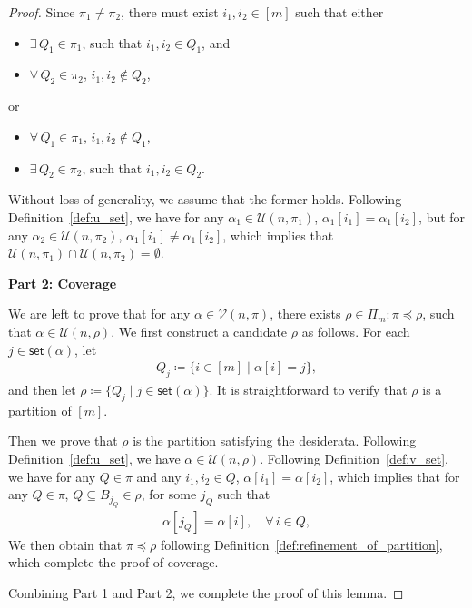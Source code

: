 \documentclass[sn-mathphys, natbib=false]{sn-jnl}
\theoremstyle{plain}
\theoremstyle{definition}
\newcommand{\sPi}{\pi}
\newcommand{\uset}{\calU}
\newcommand{\usetnm}[2]{\uset\left(#1,#2\right)}
\newcommand{\vset}{\calV}
\newcommand{\vsetp}[2]{\vset(#1,#2)}
\newcommand{\takesetp}[1]{\mathsf{set}(#1)}
\newcommand{\partition}{\Pi}
\newcommand{\partitionp}[1]{\partition_{#1}}
\newcommand{\pleq}{\preceq}
\def\calV{\mathcal{V}}
\def\calU{\mathcal{U}}
\begin{document}
\begin{bibunit}[agsm]
\begin{proof}
    Since $\pi_1 \neq \pi_2$, there must exist $i_1, i_2 \in [m]$ such that either
    \begin{itemize}
        \item $\exists \, Q_1 \in \pi_1$, such that $i_1, i_2 \in Q_1$, and
        \item $\forall \, Q_2 \in \pi_2$, $i_1, i_2 \notin Q_2$, 
    \end{itemize}
    or 
    \begin{itemize}
        \item $\forall \, Q_1 \in \pi_1$, $i_1, i_2 \notin Q_1$, 
        \item $\exists \, Q_2 \in \pi_2$, such that $i_1, i_2 \in Q_2$.  
    \end{itemize}
    Without loss of generality, we assume that the former holds. Following Definition~\ref{def:u_set}, we have for any $\alpha_1 \in \usetnm{n}{\pi_1}$, $\alpha_1[i_1] = \alpha_1[i_2]$, but for any $\alpha_2 \in \usetnm{n}{\pi_2}$, $\alpha_1[i_1] \neq \alpha_1[i_2]$, which implies that $\usetnm{n}{\pi_1} \cap \usetnm{n}{\pi_2} = \emptyset$. 

    {\bf Part 2: Coverage}

    We are left to prove that for any $\alpha \in \vsetp{n}{\sPi}$, there exists $\rho \in \partitionp{m}: \sPi \pleq \rho$, such that $\alpha \in \usetnm{n}{\rho}$. We first construct a candidate $\rho$ as follows. For each $j \in \takesetp{\alpha}$, let
    \begin{align*}
    Q_j \coloneqq \{i \in [m] \mid \alpha[i] = j\},
    \end{align*}
    and then let $\rho \coloneqq \{Q_j \mid j \in \takesetp{\alpha}\}$. It is straightforward to verify that $\rho$ is a partition of $[m]$. 
    
    Then we prove that $\rho$ is the partition satisfying the desiderata. Following Definition~\ref{def:u_set}, we have $\alpha \in \usetnm{n}{\rho}$. Following Definition~\ref{def:v_set}, we have for any $Q \in \sPi$ and any $i_1, i_2 \in Q$, $\alpha[i_1] = \alpha[i_2]$, which implies that for any $Q \in \pi$, $Q \subseteq B_{j_Q} \in \rho$, for some $j_Q$ such that
    \begin{align*}
        \alpha[j_Q] = \alpha[i], \quad \forall \, i \in Q, 
    \end{align*}
    We then obtain that $\sPi \pleq \rho$ following Definition~\ref{def:refinement_of_partition}, which complete the proof of coverage. 

    Combining Part 1 and Part 2, we complete the proof of this lemma. 
\end{proof}


\end{bibunit}
\end{document}
